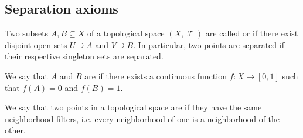 \subsection{Separation axioms}\label{subsec:separation_axioms}

\begin{definition}\label{def:topological_space_separation}
  Two subsets \( A, B \subseteq X \) of a topological space \( (X, \mscrT) \) are called  or  if there exist disjoint open sets \( U \supseteq A \) and \( V \supseteq B \). In particular, two points are separated if their respective singleton sets are separated.

  We say that \( A \) and \( B \) are  if there exists a continuous function \( f: X \to [0, 1] \) such that \( f(A) = 0 \) and \( f(B) = 1 \).
\end{definition}

\begin{definition}\label{def:topologically_indistinguishable}\mimprovised
  We say that two points in a topological space are  if they have the same \hyperref[def:neighborhood_filter]{neighborhood filters}, i.e. every neighborhood of one is a neighborhood of the other.
\end{definition}

